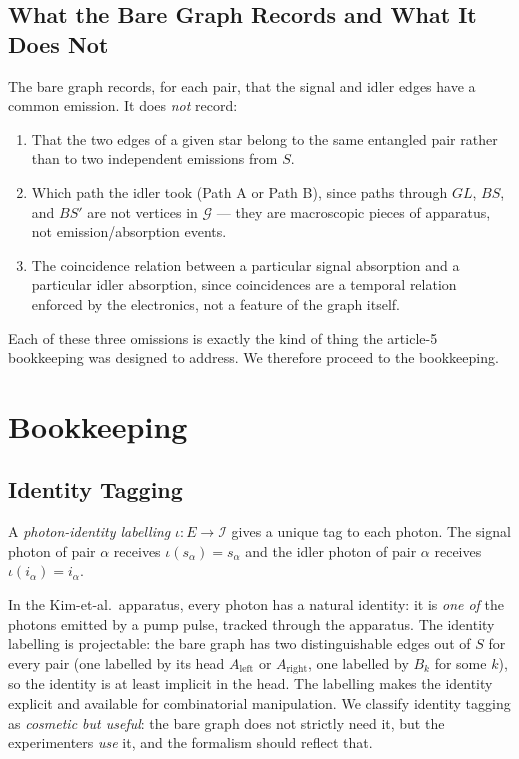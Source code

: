 \documentclass[11pt]{article}
\begin{document}
\subsection{What the Bare Graph Records and What It Does Not}

The bare graph records, for each pair, that the signal and idler edges have a common emission. It does \emph{not} record:

\begin{enumerate}
    \item That the two edges of a given star belong to the same entangled pair rather than to two independent emissions from $S$.
    \item Which path the idler took (Path A or Path B), since paths through $GL$, $BS$, and $BS'$ are not vertices in $\mathcal{G}$ --- they are macroscopic pieces of apparatus, not emission/absorption events.
    \item The coincidence relation between a particular signal absorption and a particular idler absorption, since coincidences are a temporal relation enforced by the electronics, not a feature of the graph itself.
\end{enumerate}

Each of these three omissions is exactly the kind of thing the article-5 bookkeeping was designed to address. We therefore proceed to the bookkeeping.

\section{Bookkeeping}
\label{sec:bookkeeping}

\subsection{Identity Tagging}

A \emph{photon-identity labelling} $\iota : E \to \mathcal{I}$ gives a unique tag to each photon. The signal photon of pair $\alpha$ receives $\iota(s_\alpha) = s_\alpha$ and the idler photon of pair $\alpha$ receives $\iota(i_\alpha) = i_\alpha$.

In the Kim-et-al.~apparatus, every photon has a natural identity: it is \emph{one of} the photons emitted by a pump pulse, tracked through the apparatus. The identity labelling is projectable: the bare graph has two distinguishable edges out of $S$ for every pair (one labelled by its head $A_{\text{left}}$ or $A_{\text{right}}$, one labelled by $B_k$ for some $k$), so the identity is at least implicit in the head. The labelling makes the identity explicit and available for combinatorial manipulation. We classify identity tagging as \emph{cosmetic but useful}: the bare graph does not strictly need it, but the experimenters \emph{use} it, and the formalism should reflect that.
\end{document}
